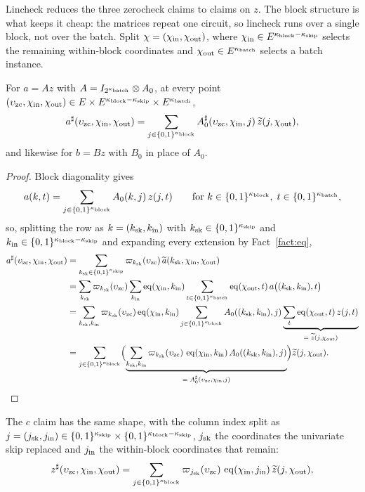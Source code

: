 Lincheck reduces the three zerocheck claims to claims on $z$. The block structure is what keeps it cheap: the matrices repeat one circuit, so lincheck runs over a single block, not over the batch. Split $\chi=(\chi_{\mathrm{in}},\chi_{\mathrm{out}})$, where $\chi_{\mathrm{in}}\in E^{\kappa_{\mathrm{block}}-\kappa_{\mathrm{skip}}}$ selects the remaining within-block coordinates and $\chi_{\mathrm{out}}\in E^{\kappa_{\mathrm{batch}}}$ selects a batch instance.

\begin{lemma}\label{lem:flock-block-diagonal}
For $a=Az$ with $A=I_{2^{\kappa_{\mathrm{batch}}}}\otimes A_0$, at every point $(\upsilon_{\mathrm{zc}},\chi_{\mathrm{in}},\chi_{\mathrm{out}})\in E\times E^{\kappa_{\mathrm{block}}-\kappa_{\mathrm{skip}}}\times E^{\kappa_{\mathrm{batch}}}$,
\[
a^{\sharp}(\upsilon_{\mathrm{zc}},\chi_{\mathrm{in}},\chi_{\mathrm{out}})=\sum_{j\in\{0,1\}^{\kappa_{\mathrm{block}}}}A^{\sharp}_0(\upsilon_{\mathrm{zc}},\chi_{\mathrm{in}},j)\,\widetilde{z}(j,\chi_{\mathrm{out}}),
\]
and likewise for $b=Bz$ with $B_0$ in place of $A_0$.
\end{lemma}

\begin{proof}
Block diagonality gives
\[
a(k,t)=\sum_{j\in\{0,1\}^{\kappa_{\mathrm{block}}}}A_0(k,j)\,z(j,t)\qquad\text{for }k\in\{0,1\}^{\kappa_{\mathrm{block}}},\;t\in\{0,1\}^{\kappa_{\mathrm{batch}}},
\]
so, splitting the row as $k=(k_{\mathrm{sk}},k_{\mathrm{in}})$ with $k_{\mathrm{sk}}\in\{0,1\}^{\kappa_{\mathrm{skip}}}$ and $k_{\mathrm{in}}\in\{0,1\}^{\kappa_{\mathrm{block}}-\kappa_{\mathrm{skip}}}$ and expanding every extension by Fact~\ref{fact:eq},
\begin{align*}
a^{\sharp}(\upsilon_{\mathrm{zc}},\chi_{\mathrm{in}},\chi_{\mathrm{out}})&=\sum_{k_{\mathrm{sk}}\in\{0,1\}^{\kappa_{\mathrm{skip}}}}\varpi_{k_{\mathrm{sk}}}(\upsilon_{\mathrm{zc}})\,\widetilde{a}(k_{\mathrm{sk}},\chi_{\mathrm{in}},\chi_{\mathrm{out}})\\
&=\sum_{k_{\mathrm{sk}}}\varpi_{k_{\mathrm{sk}}}(\upsilon_{\mathrm{zc}})\sum_{k_{\mathrm{in}}}\operatorname{eq}(\chi_{\mathrm{in}},k_{\mathrm{in}})\sum_{t\in\{0,1\}^{\kappa_{\mathrm{batch}}}}\operatorname{eq}(\chi_{\mathrm{out}},t)\,a\bigl((k_{\mathrm{sk}},k_{\mathrm{in}}),t\bigr)\\
&=\sum_{k_{\mathrm{sk}},k_{\mathrm{in}}}\varpi_{k_{\mathrm{sk}}}(\upsilon_{\mathrm{zc}})\operatorname{eq}(\chi_{\mathrm{in}},k_{\mathrm{in}})\sum_{j\in\{0,1\}^{\kappa_{\mathrm{block}}}}A_0((k_{\mathrm{sk}},k_{\mathrm{in}}),j)\underbrace{\sum_{t}\operatorname{eq}(\chi_{\mathrm{out}},t)\,z(j,t)}_{=\;\widetilde{z}(j,\chi_{\mathrm{out}})}\\
&=\sum_{j\in\{0,1\}^{\kappa_{\mathrm{block}}}}\Bigl(\underbrace{\sum_{k_{\mathrm{sk}},k_{\mathrm{in}}}\varpi_{k_{\mathrm{sk}}}(\upsilon_{\mathrm{zc}})\,\operatorname{eq}(\chi_{\mathrm{in}},k_{\mathrm{in}})\,A_0((k_{\mathrm{sk}},k_{\mathrm{in}}),j)}_{=\;A^{\sharp}_0(\upsilon_{\mathrm{zc}},\chi_{\mathrm{in}},j)}\Bigr)\widetilde{z}(j,\chi_{\mathrm{out}}).
\end{align*}
\end{proof}

The $c$ claim has the same shape, with the column index split as $j=(j_{\mathrm{sk}},j_{\mathrm{in}}) \in\{0,1\}^{\kappa_{\mathrm{skip}}} \times \{0,1\}^{\kappa_{\mathrm{block}}-\kappa_{\mathrm{skip}}}$, $j_{\mathrm{sk}}$ the coordinates the univariate skip replaced and $j_{\mathrm{in}}$ the within-block coordinates that remain:
\begin{equation}\label{flock:eq:c-as-column}
z^{\sharp}(\upsilon_{\mathrm{zc}},\chi_{\mathrm{in}},\chi_{\mathrm{out}})=\sum_{j\in\{0,1\}^{\kappa_{\mathrm{block}}}}\varpi_{j_{\mathrm{sk}}}(\upsilon_{\mathrm{zc}})\,\operatorname{eq}(\chi_{\mathrm{in}},j_{\mathrm{in}})\,\widetilde{z}(j,\chi_{\mathrm{out}}),
\end{equation}


